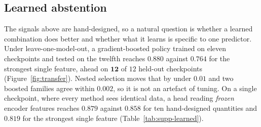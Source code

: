 \subsection{Learned abstention}
\label{sec:res-learned}

The signals above are hand-designed, so a natural question is whether a learned
combination does better and whether what it learns is specific to one predictor.
Under leave-one-model-out, a gradient-boosted policy trained on eleven checkpoints
and tested on the twelfth reaches $\mathbf{0.880}$ against $0.764$ for the
strongest single feature, ahead on $\mathbf{12}$ of $12$ held-out checkpoints
(Figure~\ref{fig:transfer}). Nested selection moves that by under $0.01$ and two
boosted families agree within $0.002$, so it is not an artefact of tuning. On a
single checkpoint, where every method sees identical data, a head reading
\emph{frozen} encoder features reaches $\mathbf{0.879}$ against $0.858$ for ten
hand-designed quantities and $0.819$ for the strongest single feature
(Table~\ref{tab:supp-learned}).



